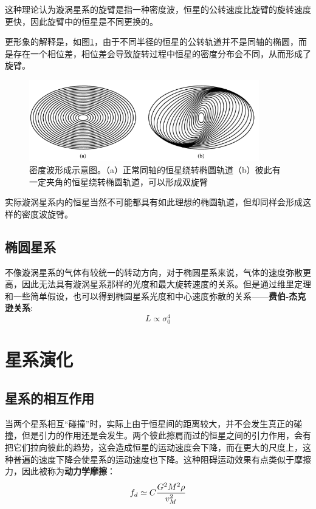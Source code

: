 \documentclass[openany]{ctexbook}
\begin{document}
这种理论认为漩涡星系的旋臂是指一种密度波，恒星的公转速度比旋臂的旋转速度更快，因此旋臂中的恒星是不同更换的。

更形象的解释是，如图\ref{fig:densitywave}，由于不同半径的恒星的公转轨道并不是同轴的椭圆，而是存在一个相位差，相位差会导致旋转过程中恒星的密度分布会不同，从而形成了旋臂。

\begin{figure}[hbt]
  \centering
  \includegraphics[width=10cm]{chapters/25/densitywave}
  \caption{密度波形成示意图。（a）正常同轴的恒星绕转椭圆轨道（b）彼此有一定夹角的恒星绕转椭圆轨道，可以形成双旋臂}
  \label{fig:densitywave}
\end{figure}

实际漩涡星系内的恒星当然不可能都具有如此理想的椭圆轨道，但却同样会形成这样的密度波旋臂。

\section{椭圆星系}
不像漩涡星系的气体有较统一的转动方向，对于椭圆星系来说，气体的速度弥散更高，因此无法具有漩涡星系那样的光度和最大旋转速度的关系。但是通过维里定理和一些简单假设，也可以得到椭圆星系光度和中心速度弥散的关系——\textbf{费伯-杰克逊关系}:
\begin{equation}
  L\propto\sigma_0^4
\end{equation}

\chapter{星系演化}
\section{星系的相互作用}
当两个星系相互``碰撞''时，实际上由于恒星间的距离较大，并不会发生真正的碰撞，但是引力的作用还是会发生。两个彼此擦肩而过的恒星之间的引力作用，会有把它们拉向彼此的趋势，这会造成恒星的运动速度会下降，而在更大的尺度上，这种普遍的速度下降会使星系的运动速度也下降。这种阻碍运动效果有点类似于摩擦力，因此被称为\textbf{动力学摩擦}：
\begin{equation}
  f_d\simeq C{G^2M^2\rho \over v_M^2}
\end{equation}
\end{document}
